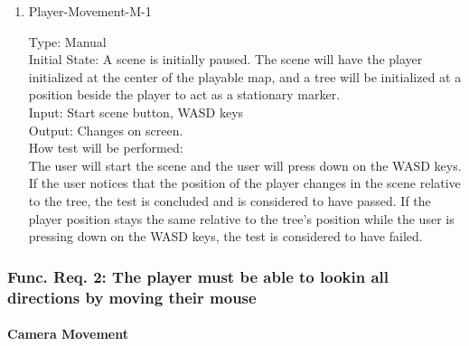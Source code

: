 \documentclass[12pt, titlepage]{article}
\begin{document}
\begin{enumerate}

\item{Player-Movement-M-1\\}

Type: Manual\\
					
Initial State: A scene is initially paused. The scene will have the player initialized at the center of the playable map, and a tree will be initialized at a position beside the player to act as a stationary marker.\\
					
Input: Start scene button, WASD keys \\
					
Output: Changes on screen. \\
					
How test will be performed:\\ The user will start the scene and the user will press down on the WASD keys. If the user notices that the position of the player changes in the scene relative to the tree, the test is concluded and is considered to have passed. If the player position stays the same relative to the tree's position while the user is pressing down on the WASD keys, the test is considered to have failed. \\

\end{enumerate}

\subsubsection{Func. Req. 2: The player must be able to lookin all directions by moving their mouse}
		
\paragraph{Camera Movement}
\end{document}
